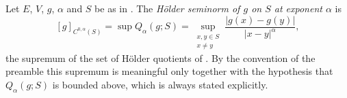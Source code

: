 \begin{definition}
Let $E$, $V$, $g$, $\alpha$ and $S$ be as in . The
\emph{H\"older seminorm of $g$ on $S$ at exponent $\alpha$} is
\[
  [g]_{C^{0,\alpha}(S)}
   =\sup Q_\alpha(g;S)
   =\sup_{\substack{x,y\in S\\x\ne y}}
       \frac{|g(x)-g(y)|}{|x-y|^\alpha},
\]
the supremum of the set of H\"older quotients of . By the
convention of the preamble this supremum is meaningful only together with the
hypothesis that $Q_\alpha(g;S)$ is bounded above, which is always stated
explicitly.
\end{definition}
